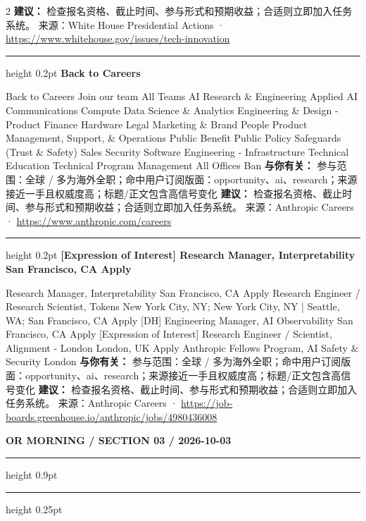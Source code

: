 \documentclass[10.5pt]{ctexart}
\begin{document}
\begin{multicols}{2}
\textbf{建议：} 检查报名资格、截止时间、参与形式和预期收益；合适则立即加入任务系统。
{\footnotesize\color{ormuted} 来源：White House Presidential Actions · \url{https://www.whitehouse.gov/issues/tech-innovation}}
\vspace{2mm}
\hrule height 0.2pt
\vspace{2mm}
{\large\bfseries Back to Careers}\par
Back to Careers Join our team All Teams AI Research \& Engineering Applied AI Communications Compute Data Science \& Analytics Engineering \& Design - Product Finance Hardware Legal Marketing \& Brand People Product Management, Support, \& Operations Public Benefit Public Policy Safeguards (Trust \& Safety) Sales Security Software Engineering - Infrastructure Technical Education Technical Program Management All Offices Ban
\textbf{与你有关：} 参与范围：全球 / 多为海外全职；命中用户订阅版面：opportunity、ai、research；来源接近一手且权威度高；标题/正文包含高信号变化
\textbf{建议：} 检查报名资格、截止时间、参与形式和预期收益；合适则立即加入任务系统。
{\footnotesize\color{ormuted} 来源：Anthropic Careers · \url{https://www.anthropic.com/careers}}
\vspace{2mm}
\hrule height 0.2pt
\vspace{2mm}
{\large\bfseries [Expression of Interest] Research Manager, Interpretability San Francisco, CA Apply}\par
[Expression of Interest] Research Manager, Interpretability San Francisco, CA Apply Research Engineer / Research Scientist, Tokens New York City, NY; New York City, NY | Seattle, WA; San Francisco, CA Apply [DH] Engineering Manager, AI Observability San Francisco, CA Apply [Expression of Interest] Research Engineer / Scientist, Alignment - London London, UK Apply Anthropic Fellows Program, AI Safety \& Security London
\textbf{与你有关：} 参与范围：全球 / 多为海外全职；命中用户订阅版面：opportunity、ai、research；来源接近一手且权威度高；标题/正文包含高信号变化
\textbf{建议：} 检查报名资格、截止时间、参与形式和预期收益；合适则立即加入任务系统。
{\footnotesize\color{ormuted} 来源：Anthropic Careers · \url{https://job-boards.greenhouse.io/anthropic/jobs/4980436008}}
\end{multicols}
\newpage
{\small\bfseries OR MORNING / SECTION 03 / 2026-10-03}
\vspace{2mm}
\hrule height 0.9pt
\vspace{1.5mm}
\hrule height 0.25pt
\vspace{4mm}
\end{document}
